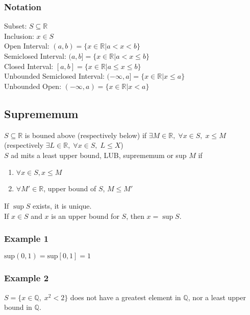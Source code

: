 \documentclass[11pt]{article}
\newcommand{\0}{\emptyset}
\newcommand{\Q}{\mathbb{Q}}
\newcommand{\R}{\mathbb{R}}
\begin{document}
\subsubsection*{Notation}
\label{sec:orgea54e58}
Subset: \(S\subseteq\R\)\\[0pt]
Inclusion: \(x\in S\)\\[0pt]
Open Interval: \((a,b)=\{x\in\R|a<x<b\}\)\\[0pt]
Semiclosed Interval: \((a,b]=\{x\in\R|a<x\leq b\}\)\\[0pt]
Closed Interval: \([a,b]=\{x\in\R|a\leq x\leq b\}\)\\[0pt]
Unbounded Semiclosed Interval: \((-\infty,a]=\{x\in\R|x\leq a\}\)\\[0pt]
Unbounded Open: \((-\infty,a)=\{x\in\R|x< a\}\)\\[0pt]
\subsection*{Suprememum}
\label{sec:org25894fa}
\(S\subseteq\R\) is bouned above (respectively below) if \(\exists M\in\R,\;\forall x\in S,\;x\leq M\) (respectively \(\exists L\in\R,\;\forall x\in S,\; L\leq X\))\\[0pt]
\(S\) ad mits a least upper bound, LUB, suprememum or sup \(M\) if\\[0pt]
\begin{enumerate}
\item \(\forall x\in S,x\leq M\)\\[0pt]
\item \(\forall M'\in\R\), upper bound of \(S\), \(M\leq M'\)\\[0pt]
\end{enumerate}
If \(\sup{S}\) exists, it is unique.\\[0pt]
If \(x\in S\) and \(x\) is an upper bound for \(S\), then \(x=\sup{S}\).\\[0pt]
\subsubsection*{Example 1}
\label{sec:org0cb9cfb}
\(\text{sup}(0,1)=\text{sup}[0,1]=1\)\\[0pt]
\subsubsection*{Example 2}
\label{sec:org111017b}
\(S=\{x\in\Q,\;x^{2}<2\}\) does not have a greatest element in \(\Q\), nor a least upper bound in \(\Q\).\\[0pt]
\end{document}
